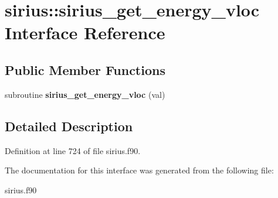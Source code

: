 \hypertarget{interfacesirius_1_1sirius__get__energy__vloc}{}\section{sirius\+:\+:sirius\+\_\+get\+\_\+energy\+\_\+vloc Interface Reference}
\label{interfacesirius_1_1sirius__get__energy__vloc}
\subsection*{Public Member Functions}
\begin{DoxyCompactItemize}
\item 
\hypertarget{interfacesirius_1_1sirius__get__energy__vloc_a23a86e86eb498665f54a37f89a39ecdb}{}subroutine {\bfseries sirius\+\_\+get\+\_\+energy\+\_\+vloc} (val)\label{interfacesirius_1_1sirius__get__energy__vloc_a23a86e86eb498665f54a37f89a39ecdb}

\end{DoxyCompactItemize}


\subsection{Detailed Description}


Definition at line 724 of file sirius.\+f90.



The documentation for this interface was generated from the following file\+:\begin{DoxyCompactItemize}
\item 
sirius.\+f90\end{DoxyCompactItemize}
